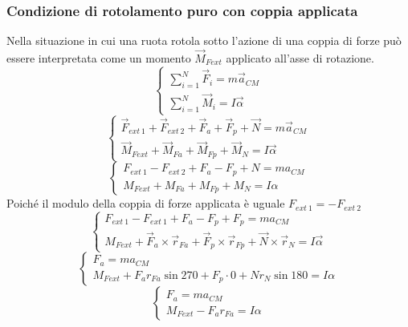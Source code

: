 \documentclass[twoside]{article}
\begin{document}
\subsubsection{Condizione di rotolamento puro con coppia applicata}
Nella situazione in cui una ruota rotola sotto l’azione di una coppia di forze può essere interpretata come un momento \(\vec{M}_{Fext}\) applicato all’asse di rotazione.\\
\begin{equation*}
  \begin{cases}
    \displaystyle \sum_{i=1}^{N} \vec{F}_i = m \vec{a}_{CM} \\
    \displaystyle \sum_{i=1}^{N} \vec{M}_i = I \vec{\alpha}
  \end{cases}
\end{equation*}
\begin{equation*}
  \begin{cases}
    \vec{F}_{ext\ 1} +\vec{F}_{ext\ 2} + \vec{F}_{a} + \vec{F}_p + \vec{N} = m \vec{a}_{CM} \\
    \vec{M}_{Fext} + \vec{M}_{Fa} + \vec{M}_{Fp} + \vec{M}_{N} = I \vec{\alpha}
  \end{cases}
\end{equation*}
\begin{equation*}
  \begin{cases}
    F_{ext\ 1} -F_{ext\ 2} + F_{a} - F_{p} + N  = m a_{CM} \\
    {M}_{Fext} + M_{Fa} + M_{Fp} + M_{N} = I \alpha
  \end{cases}
\end{equation*}
Poiché il modulo della coppia di forze applicata è uguale \( F_{ext\ 1} = - F_{ext\ 2} \)
\begin{equation*}
  \begin{cases}
    F_{ext\ 1} -F_{ext\ 1} + F_{a} - F_{p} + F_{p}  = m a_{CM} \\
    {M}_{Fext}  + \vec{F}_{a} \times \vec{r}_{Fa} + \vec{F}_{p} \times \vec{r}_{Fp} + \vec{N} \times \vec{r}_{N} = I \vec{\alpha}
  \end{cases}
\end{equation*}
\begin{equation*}
  \begin{cases}
    F_{a} = m a_{CM} \\
    {M}_{Fext} + F_{a} r_{Fa} \sin{270} + F_{p} \cdot 0 + N r_{N} \sin{180} = I \alpha
  \end{cases}
\end{equation*}
\begin{equation*}
  \begin{cases}
    F_{a} = m a_{CM} \\
    {M}_{Fext} - F_{a} r_{Fa} = I \alpha
  \end{cases}
\end{equation*}
\end{document}
